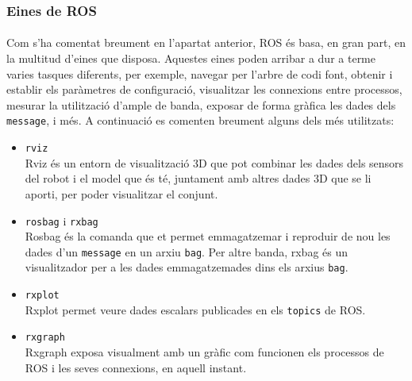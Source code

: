 \documentclass[12pt,a4paper,final,twoside]{article}
\begin{document}
\subsubsection{Eines de ROS}
\paragraph{}Com s'ha comentat breument en l'apartat anterior, ROS és basa, en gran part, en la multitud d'eines que disposa. Aquestes eines poden arribar a dur a terme varies tasques diferents, per exemple, navegar per l'arbre de codi font, obtenir i establir els paràmetres de configuració, visualitzar les connexions entre processos, mesurar la utilització d'ample de banda, exposar de forma gràfica les dades dels \texttt{message}, i més. A continuació es comenten breument alguns dels més utilitzats:
\begin{itemize}
\item \texttt{rviz}\\
Rviz és un entorn de visualització 3D que pot combinar les dades dels sensors del robot i el model que és té, juntament amb altres dades 3D que se li aporti, per poder visualitzar el conjunt.

\item \texttt{rosbag} i \texttt{rxbag}\\
Rosbag és la comanda que et permet emmagatzemar i reproduir de nou les dades d'un \texttt{message} en un arxiu \texttt{bag}. Per altre banda, rxbag és un visualitzador per a les dades emmagatzemades dins els arxius \texttt{bag}.

\item \texttt{rxplot}\\
Rxplot permet veure dades escalars publicades en els \texttt{topics} de ROS.

\item \texttt{rxgraph}\\
Rxgraph exposa visualment amb un gràfic com funcionen els processos de ROS i les seves connexions, en aquell instant.

\end{itemize}

\end{document}
